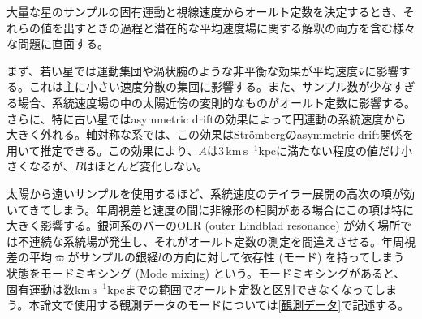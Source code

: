 
大量な星のサンプルの固有運動と視線速度からオールト定数を決定するとき、それらの値を出すときの過程と潜在的な平均速度場に関する解釈の両方を含む様々な問題に直面する。

まず、若い星では運動集団や渦状腕のような非平衡な効果が平均速度$\overline{\pmb{v}}$に影響する。これは主に小さい速度分散の集団に影響する。また、サンプル数が少なすぎる場合、系統速度場の中の太陽近傍の変則的なものがオールト定数に影響する。さらに、特に古い星ではasymmetric driftの効果によって円運動の系統速度から大きく外れる。軸対称な系では、この効果はStr\"{o}mbergのasymmetric drift関係を用いて推定できる。この効果により、$A$は$3\,\mathrm{km\,s^{-1}kpc}$に満たない程度の値だけ小さくなるが、$B$はほとんど変化しない。

太陽から遠いサンプルを使用するほど、系統速度のテイラー展開の高次の項が効いてきてしまう。年周視差と速度の間に非線形の相関がある場合にこの項は特に大きく影響する。銀河系のバーのOLR (outer Lindblad resonance) が効く場所では不連続な系統場が発生し、それがオールト定数の測定を間違えさせる。年周視差の平均$\overline{\varpi}$がサンプルの銀経$l$の方向に対して依存性 (モード) を持ってしまう状態をモードミキシング (Mode mixing) という。モードミキシングがあると、固有運動は数$\mathrm{km\,s^{-1}kpc}$までの範囲でオールト定数と区別できなくなってしまう。本論文で使用する観測データのモードについては\ref{観測データ}で記述する。


